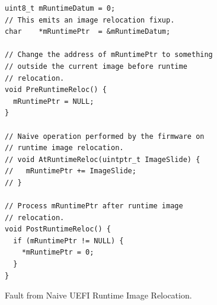 \begin{lstfloat}[htbp]
  \centering
  \begin{lstlisting}[style=c]
uint8_t mRuntimeDatum = 0;
// This emits an image relocation fixup.
char    *mRuntimePtr  = &mRuntimeDatum;

// Change the address of mRuntimePtr to something
// outside the current image before runtime
// relocation.
void PreRuntimeReloc() {
  mRuntimePtr = NULL;
}

// Naive operation performed by the firmware on
// runtime image relocation.
// void AtRuntimeReloc(uintptr_t ImageSlide) {
//   mRuntimePtr += ImageSlide;
// }

// Process mRuntimePtr after runtime image
// relocation.
void PostRuntimeReloc() {
  if (mRuntimePtr != NULL) {
    *mRuntimePtr = 0;
  }
}
  \end{lstlisting}
  \caption{Fault from Naive UEFI Runtime Image Relocation.}
  \label{fig:native_uefi_rt_reloc}
  \caption*{Faulting program assuming naive  \gls{runtime-image-relocation}. This strictly assumes the  specification's description of \lstinline|SetVirtualAddressMap()|~\cite{uefi-spec}. As \lstinline|mRuntimePtr| is initialized with the absolute address of a global variable, an \gls{image-relocation-fixup} is emitted for it~(see ). Before entering the runtime phase, we set the pointer to \lstinline[style=c]|NULL|. Due to the recorded \gls{image-relocation-fixup} for the previous address, \lstinline[style=c]|NULL| is relocated, and the final value is exactly \lstinline|ImageSlide = NewBase - OldBase|, i.e. a rogue pointer. After the \gls{runtime-image-relocation} has succeeded, we run some code that changes the value of \lstinline|mRuntimePtr| if and only if it is not \lstinline|NULL|, a common way to signal pointer liveness. At this point, we corrupt arbitrary memory, even though the code is semantically correct.}
\end{lstfloat}

